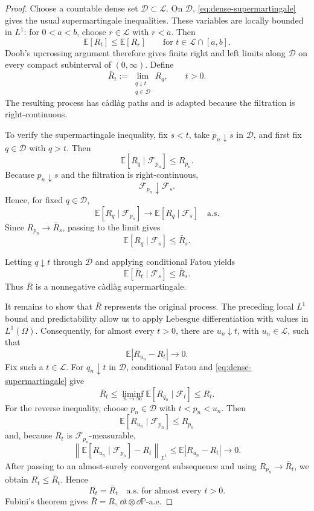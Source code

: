 \documentclass[12pt]{article}
\newcommand{\E}{\mathbb{E}}
\begin{document}
\begin{proof}
Choose a countable dense set \(\mathcal D\subset\mathcal L\). On
\(\mathcal D\), \eqref{eq:dense-supermartingale} gives the usual
supermartingale inequalities. These variables are locally bounded in
\(L^1\): for \(0<a<b\), choose \(r\in\mathcal L\) with \(r<a\). Then
\[
  \E[R_t]\le\E[R_r]
  \qquad
  \text{for }t\in\mathcal L\cap[a,b].
\]
Doob's upcrossing argument therefore gives finite right and left limits
along \(\mathcal D\) on every compact subinterval of \((0,\infty)\).
Define
\[
  \bar R_t
  :=
  \lim_{\substack{q\downarrow t\\q\in\mathcal D}}R_q,
  \qquad t>0.
\]
The resulting process has c\`adl\`ag paths and is adapted because the
filtration is right-continuous.

To verify the supermartingale inequality, fix \(s<t\), take
\(p_n\downarrow s\) in \(\mathcal D\), and first fix
\(q\in\mathcal D\) with \(q>t\). Then
\[
  \E[R_q\mid\mathcal F_{p_n}]\le R_{p_n}.
\]
Because \(p_n\downarrow s\) and the filtration is right-continuous,
\[
  \mathcal F_{p_n}\downarrow\mathcal F_s.
\]
Hence, for fixed \(q\in\mathcal D\),
\[
  \E[R_q\mid\mathcal F_{p_n}]
  \longrightarrow
  \E[R_q\mid\mathcal F_s]
  \quad\text{a.s.}
\]
Since \(R_{p_n}\to\bar R_s\), passing to the limit gives
\[
  \E[R_q\mid\mathcal F_s]\le\bar R_s.
\]


Letting \(q\downarrow t\) through \(\mathcal D\) and applying
conditional Fatou yields
\[
  \E[\bar R_t\mid\mathcal F_s]\le\bar R_s.
\]
Thus \(\bar R\) is a nonnegative c\`adl\`ag supermartingale.

It remains to show that \(\bar R\) represents the original process.
The preceding local \(L^1\) bound and predictability allow us to apply
Lebesgue differentiation with values in \(L^1(\Omega)\). Consequently,
for almost every \(t>0\), there are \(u_n\downarrow t\), with
\(u_n\in\mathcal L\), such that
\begin{equation}\label{eq:L1-right-approximation}
  \E|R_{u_n}-R_t|\longrightarrow0.
\end{equation}
Fix such a \(t\in\mathcal L\). For \(q_n\downarrow t\) in \(\mathcal D\),
conditional Fatou and \eqref{eq:dense-supermartingale} give
\[
  \bar R_t
  \le
  \liminf_{n\to\infty}
    \E[R_{q_n}\mid\mathcal F_t]
  \le R_t.
\]
For the reverse inequality, choose
\(p_n\in\mathcal D\) with \(t<p_n<u_n\). Then
\[
  \E[R_{u_n}\mid\mathcal F_{p_n}]\le R_{p_n}
\]
and, because \(R_t\) is \(\mathcal F_{p_n}\)-measurable,
\[
  \left\|
    \E[R_{u_n}\mid\mathcal F_{p_n}]-R_t
  \right\|_{L^1}
  \le
  \E|R_{u_n}-R_t|
  \longrightarrow0.
\]
After passing to an almost-surely convergent subsequence and using
\(R_{p_n}\to\bar R_t\), we obtain \(R_t\le\bar R_t\). Hence
\[
  R_t=\bar R_t
  \quad\text{a.s. for almost every }t>0.
\]
Fubini's theorem gives
\(\bar R=R\), \(\dd t\otimes\dd\mathbb P\)-a.e.


\end{proof}
\end{document}
